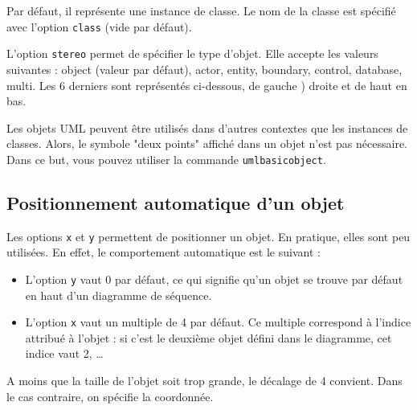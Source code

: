 \documentclass[a4paper,11pt]{report}
\newcommand{\inputTikZ}[1]{%
  }%
\newcommand{\inputTikZ}[1]{%
    \texttt{[image: fig/\#1.pdf]}%
  }%
\begin{document}
\medskip

Par défaut, il représente une instance de classe. Le nom de la classe est spécifié avec l'option {\tt class} (vide par défaut). 

\medskip

L'option {\tt stereo} permet de spécifier le type d'objet. Elle accepte les valeurs suivantes : object (valeur par défaut), actor, entity, boundary, control, database, multi. Les 6 derniers sont représentés ci-dessous, de gauche ) droite et de haut en bas.

\medskip

\begin{minipage}{0.5\textwidth}

\end{minipage}
\begin{minipage}{0.5\textwidth}
\begin{center}
\inputTikZ{objectstereo}
\end{center}
\end{minipage}

\medskip

Les objets UML peuvent être utilisés dans d'autres contextes que les instances de classes. Alors, le symbole "deux points" affiché dans un objet n'est pas nécessaire. Dans ce but, vous pouvez utiliser la commande {\tt umlbasicobject}.

\subsection{Positionnement automatique d'un objet}\label{ss.objpos}

Les options {\tt x} et {\tt y} permettent de positionner un objet. En pratique, elles sont peu utilisées. En effet, le comportement automatique est le suivant :

\begin{itemize}
\item L'option {\tt y} vaut 0 par défaut, ce qui signifie qu'un objet se trouve par défaut en haut d'un diagramme de séquence.
\item L'option {\tt x} vaut un multiple de 4 par défaut. Ce multiple correspond à l'indice attribué à l'objet : si c'est le deuxième objet défini dans le diagramme, cet indice vaut 2, \ldots
\end{itemize}

A moins que la taille de l'objet soit trop grande, le décalage de 4 convient. Dans le cas contraire, on spécifie la coordonnée.
\end{document}
